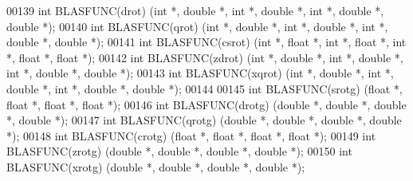 \begin{DoxyCode}
00139 \textcolor{keywordtype}{int}    BLASFUNC(drot)  (\textcolor{keywordtype}{int} *, \textcolor{keywordtype}{double} *, \textcolor{keywordtype}{int} *, \textcolor{keywordtype}{double} *, \textcolor{keywordtype}{int} *, \textcolor{keywordtype}{double} *, \textcolor{keywordtype}{double} *);
00140 \textcolor{keywordtype}{int}    BLASFUNC(qrot)  (\textcolor{keywordtype}{int} *, \textcolor{keywordtype}{double} *, \textcolor{keywordtype}{int} *, \textcolor{keywordtype}{double} *, \textcolor{keywordtype}{int} *, \textcolor{keywordtype}{double} *, \textcolor{keywordtype}{double} *);
00141 \textcolor{keywordtype}{int}    BLASFUNC(csrot) (\textcolor{keywordtype}{int} *, \textcolor{keywordtype}{float}  *, \textcolor{keywordtype}{int} *, \textcolor{keywordtype}{float}  *, \textcolor{keywordtype}{int} *, \textcolor{keywordtype}{float}  *, \textcolor{keywordtype}{float}  *);
00142 \textcolor{keywordtype}{int}    BLASFUNC(zdrot) (\textcolor{keywordtype}{int} *, \textcolor{keywordtype}{double} *, \textcolor{keywordtype}{int} *, \textcolor{keywordtype}{double} *, \textcolor{keywordtype}{int} *, \textcolor{keywordtype}{double} *, \textcolor{keywordtype}{double} *);
00143 \textcolor{keywordtype}{int}    BLASFUNC(xqrot) (\textcolor{keywordtype}{int} *, \textcolor{keywordtype}{double} *, \textcolor{keywordtype}{int} *, \textcolor{keywordtype}{double} *, \textcolor{keywordtype}{int} *, \textcolor{keywordtype}{double} *, \textcolor{keywordtype}{double} *);
00144 
00145 \textcolor{keywordtype}{int}    BLASFUNC(srotg) (\textcolor{keywordtype}{float}  *, \textcolor{keywordtype}{float}  *, \textcolor{keywordtype}{float}  *, \textcolor{keywordtype}{float}  *);
00146 \textcolor{keywordtype}{int}    BLASFUNC(drotg) (\textcolor{keywordtype}{double} *, \textcolor{keywordtype}{double} *, \textcolor{keywordtype}{double} *, \textcolor{keywordtype}{double} *);
00147 \textcolor{keywordtype}{int}    BLASFUNC(qrotg) (\textcolor{keywordtype}{double} *, \textcolor{keywordtype}{double} *, \textcolor{keywordtype}{double} *, \textcolor{keywordtype}{double} *);
00148 \textcolor{keywordtype}{int}    BLASFUNC(crotg) (\textcolor{keywordtype}{float}  *, \textcolor{keywordtype}{float}  *, \textcolor{keywordtype}{float}  *, \textcolor{keywordtype}{float}  *);
00149 \textcolor{keywordtype}{int}    BLASFUNC(zrotg) (\textcolor{keywordtype}{double} *, \textcolor{keywordtype}{double} *, \textcolor{keywordtype}{double} *, \textcolor{keywordtype}{double} *);
00150 \textcolor{keywordtype}{int}    BLASFUNC(xrotg) (\textcolor{keywordtype}{double} *, \textcolor{keywordtype}{double} *, \textcolor{keywordtype}{double} *, \textcolor{keywordtype}{double} *);

\end{DoxyCode}
